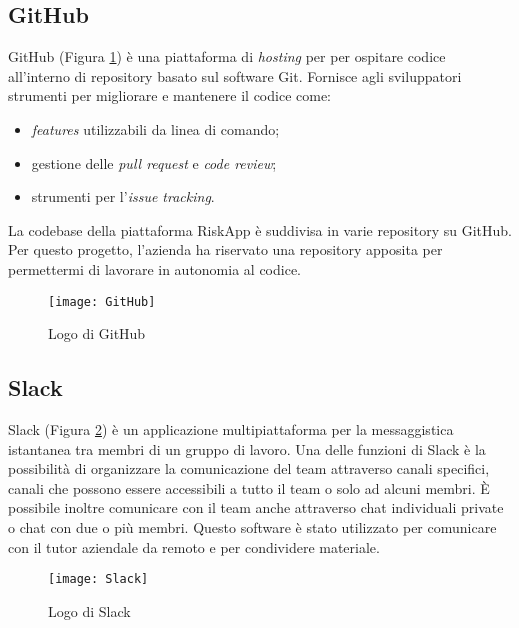 \subsection{GitHub}
GitHub (Figura \ref{fig:github}) è una piattaforma di \emph{hosting} per per ospitare codice all'interno di repository basato sul software Git.\newline
Fornisce agli sviluppatori strumenti per migliorare e mantenere il codice come:
\begin{itemize}
    \item \emph{features} utilizzabili da linea di comando;
    \item gestione delle \emph{pull request} e \emph{code review};
    \item strumenti per l’\emph{issue tracking}.
\end{itemize}
La codebase della piattaforma RiskApp è suddivisa in varie repository su GitHub.\newline
Per questo progetto, l'azienda ha riservato una repository apposita per permettermi di lavorare in autonomia al codice.\newline
\begin{figure}[!h] 
    \centering 
    \texttt{[image: GitHub]} 
    \caption{Logo di GitHub}\label{fig:github}
\end{figure}

\newpage

\subsection{Slack}
Slack (Figura \ref{fig:slack}) è un applicazione multipiattaforma per la messaggistica istantanea tra membri di un gruppo di lavoro.\newline
Una delle funzioni di Slack è la possibilità di organizzare la comunicazione del team attraverso canali specifici, canali che possono essere accessibili a tutto il team o solo ad alcuni membri.\newline
È possibile inoltre comunicare con il team anche attraverso chat individuali private o chat con due o più membri.\newline
Questo software è stato utilizzato per comunicare con il tutor aziendale da remoto e per condividere materiale.\newline
\begin{figure}[!h] 
    \centering 
    \texttt{[image: Slack]} 
    \caption{Logo di Slack}\label{fig:slack}
\end{figure}

